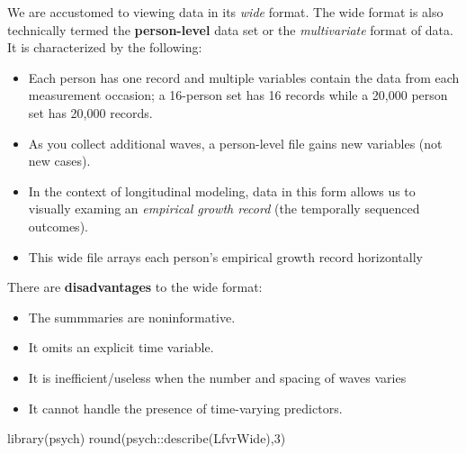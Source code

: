 \documentclass[
  english,
]{book}
\newenvironment{Shaded}{\begin{snugshade}}{\end{snugshade}}
\newcommand{\DecValTok}[1]{\textcolor[rgb]{0.00,0.00,0.81}{#1}}
\newcommand{\FunctionTok}[1]{\textcolor[rgb]{0.00,0.00,0.00}{#1}}
\newcommand{\NormalTok}[1]{#1}
\newcommand{\SpecialCharTok}[1]{\textcolor[rgb]{0.00,0.00,0.00}{#1}}
\providecommand{\tightlist}{%
  \setlength{\itemsep}{0pt}\setlength{\parskip}{0pt}}
\begin{document}
We are accustomed to viewing data in its \emph{wide} format. The wide format is also technically termed the \textbf{person-level} data set or the \emph{multivariate} format of data. It is characterized by the following:

\begin{itemize}
\tightlist
\item
  Each person has one record and multiple variables contain the data from each measurement occasion; a 16-person set has 16 records while a 20,000 person set has 20,000 records.
\item
  As you collect additional waves, a person-level file gains new variables (not new cases).
\item
  In the context of longitudinal modeling, data in this form allows us to visually examing an \emph{empirical growth record} (the temporally sequenced outcomes).
\item
  This wide file arrays each person's empirical growth record horizontally
\end{itemize}

There are \textbf{disadvantages} to the wide format:

\begin{itemize}
\tightlist
\item
  The summmaries are noninformative.
\item
  It omits an explicit time variable.
\item
  It is inefficient/useless when the number and spacing of waves varies
\item
  It cannot handle the presence of time-varying predictors.
\end{itemize}

\begin{Shaded}
\begin{Highlighting}[]
\FunctionTok{library}\NormalTok{(psych)}
\FunctionTok{round}\NormalTok{(psych}\SpecialCharTok{::}\FunctionTok{describe}\NormalTok{(LfvrWide),}\DecValTok{3}\NormalTok{)}
\end{Highlighting}
\end{Shaded}
\end{document}
